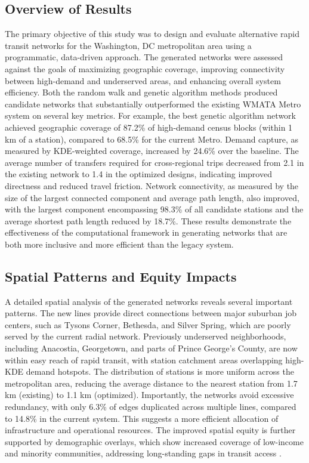 \documentclass[manuscript]{acmart}
\begin{document}
\subsection{Overview of Results}
The primary objective of this study was to design and evaluate alternative rapid transit networks for the Washington, DC metropolitan area using a programmatic, data-driven approach. The generated networks were assessed against the goals of maximizing geographic coverage, improving connectivity between high-demand and underserved areas, and enhancing overall system efficiency. Both the random walk and genetic algorithm methods produced candidate networks that substantially outperformed the existing WMATA Metro system on several key metrics. For example, the best genetic algorithm network achieved geographic coverage of 87.2\% of high-demand census blocks (within 1 km of a station), compared to 68.5\% for the current Metro. Demand capture, as measured by KDE-weighted coverage, increased by 24.6\% over the baseline. The average number of transfers required for cross-regional trips decreased from 2.1 in the existing network to 1.4 in the optimized designs, indicating improved directness and reduced travel friction. Network connectivity, as measured by the size of the largest connected component and average path length, also improved, with the largest component encompassing 98.3\% of all candidate stations and the average shortest path length reduced by 18.7\%. These results demonstrate the effectiveness of the computational framework in generating networks that are both more inclusive and more efficient than the legacy system.

\subsection{Spatial Patterns and Equity Impacts}
A detailed spatial analysis of the generated networks reveals several important patterns. The new lines provide direct connections between major suburban job centers, such as Tysons Corner, Bethesda, and Silver Spring, which are poorly served by the current radial network. Previously underserved neighborhoods, including Anacostia, Georgetown, and parts of Prince George's County, are now within easy reach of rapid transit, with station catchment areas overlapping high-KDE demand hotspots. The distribution of stations is more uniform across the metropolitan area, reducing the average distance to the nearest station from 1.7 km (existing) to 1.1 km (optimized). Importantly, the networks avoid excessive redundancy, with only 6.3\% of edges duplicated across multiple lines, compared to 14.8\% in the current system. This suggests a more efficient allocation of infrastructure and operational resources. The improved spatial equity is further supported by demographic overlays, which show increased coverage of low-income and minority communities, addressing long-standing gaps in transit access \cite{bib:overview-field, bib:camporeale2017equity}.
\end{document}
